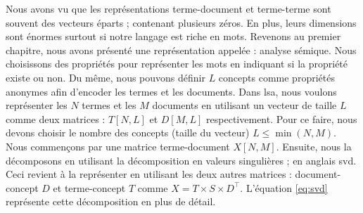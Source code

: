 \documentclass{KodeBook}
\begin{document}
Nous avons vu que les représentations terme-document et terme-terme sont souvent des vecteurs éparts ; contenant plusieurs zéros. 
En plus, leurs dimensions sont énormes surtout si notre langage est riche en mots. 
Revenons au premier chapitre, nous avons présenté une représentation appelée : analyse sémique. 
Nous choisissons des propriétés pour représenter les mots en indiquant si la propriété existe ou non. 
Du même, nous pouvons définir $L$ concepts comme propriétés anonymes afin d'encoder les termes et les documents. 
Dans \ac{lsa}, nous voulons représenter les $N$ termes et les $M$ documents en utilisant un vecteur de taille $L$ comme deux matrices : $T[N, L]$ et $D[M, L]$ respectivement.
Pour ce faire, nous devons choisir le nombre des concepts (taille du vecteur) $L \le \min(N, M)$. 
Nous commençons par une matrice terme-document $X[N, M]$. 
Ensuite, nous la décomposons en utilisant la décomposition en valeurs singulières ; en anglais \ac{svd}. 
Ceci revient à la représenter en utilisant les deux autres matrices : document-concept $D$ et terme-concept $T$ comme
$X = T \times S \times D^\top$. 
L'équation \ref{eq:svd} représente cette décomposition en plus de détail. 
\end{document}
